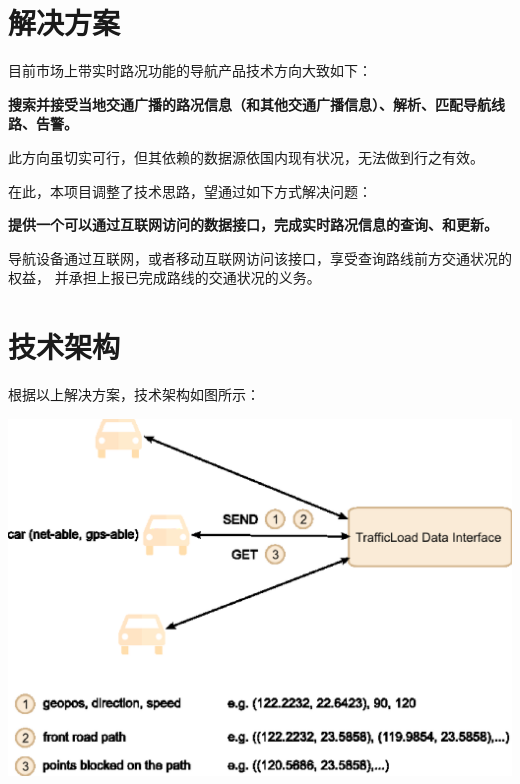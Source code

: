 \documentclass{article}
\begin{document}
  \section{解决方案}
  目前市场上带实时路况功能的导航产品技术方向大致如下：

  \textbf{搜索并接受当地交通广播的路况信息（和其他交通广播信息）、解析、匹配导航线路、告警。}

  此方向虽切实可行，但其依赖的数据源依国内现有状况，无法做到行之有效。

  在此，本项目调整了技术思路，望通过如下方式解决问题：

  \textbf{提供一个可以通过互联网访问的数据接口，完成实时路况信息的查询、和更新。}

  导航设备通过互联网，或者移动互联网访问该接口，享受查询路线前方交通状况的权益，
  并承担上报已完成路线的交通状况的义务。



  \section{技术架构}
  根据以上解决方案，技术架构如图所示：
  \begin{center}
    \includegraphics[width=1.2\textwidth]{tldi.eps}
  \end{center}

  \newpage
  
\end{document}
